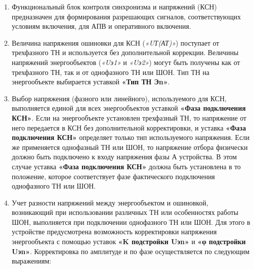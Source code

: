 \color{black}

\begin{enumerate}

\item
Функциональный блок контроля синхронизма и напряжений (КСН) предназначен для формирования разрешающих сигналов, соответствующих условиям включения, для АПВ и оперативного включения.

\item
Величина напряжения ошиновки для КСН (\textit{«UТ(АТ)»}) поступает от трехфазного ТН и используется без дополнительной коррекции. Величины напряжений энергообъектов (\textit{«Uэ1»} и \textit{«Uэ2»}) могут быть получены как от трехфазного ТН, так и от однофазного ТН или ШОН. Тип ТН на энергообъекте выбирается уставкой \textbf{«Тип ТН Эn»}.

\item
Выбор напряжения (фазного или линейного), используемого для КСН, выполняется единой для всех энергообъектов уставкой \textbf{«Фаза подключения КСН»}. Если на энергообъекте установлен трехфазный ТН, то напряжение от него передается в КСН без дополнительной корректировки, и уставка \textbf{«Фаза подключения КСН»} определяет только тип используемого напряжения. Если же применяется однофазный ТН или ШОН, то напряжение отбора физически должно быть подключено к входу напряжения фазы А устройства. В этом случае уставка \textbf{«Фаза подключения КСН»} должна быть установлена в то положение, которое соответствует фазе фактического подключения однофазного ТН или ШОН.

\item
Учет разности напряжений между энергообъектом и ошиновкой, возникающий при использовании различных ТН или особенностях работы ШОН, выполняется при подключении однофазного ТН или ШОН. Для этого в устройстве предусмотрена возможность корректировки напряжения энергообъекта с помощью уставок \textbf{«K подстройки Uэn»} и \textbf{«φ подстройки Uэn»}. Корректировка по амплитуде и по фазе осуществляется по следующим выражениям:


\end{enumerate}
